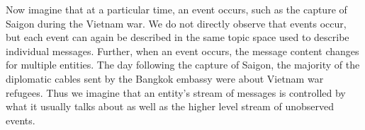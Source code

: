 Now imagine that at a particular time, an event occurs, such as the capture of Saigon during the Vietnam war.  We do not directly observe that events occur, but each event can again be described in the same topic space used to describe individual messages.  Further, when an event occurs, the message content changes for multiple entities. The day following the capture of Saigon, the majority of the diplomatic cables sent by the Bangkok embassy were about Vietnam war refugees.
Thus we imagine that an entity's stream of messages is controlled by what it usually talks about as well as the higher level stream of unobserved events.




